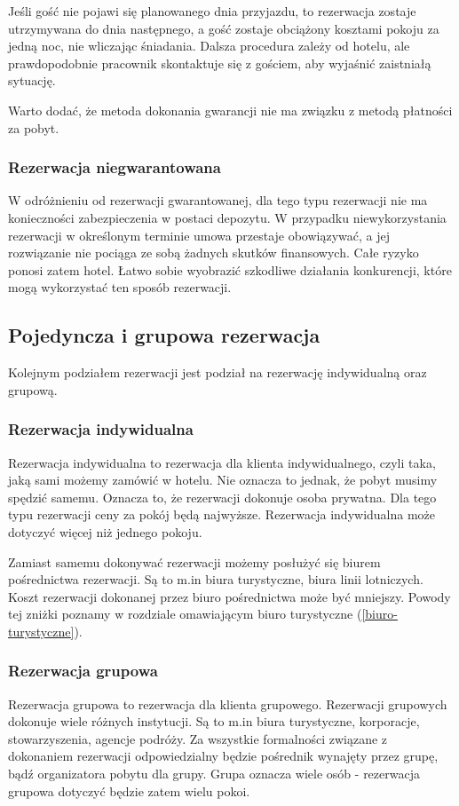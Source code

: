 \documentclass[a4paper,onecolumn,oneside,11pt,wide,floatssmall]{mwrep}
\theoremstyle{definition}
\theoremstyle{plain}%
\theoremstyle{remark}
\begin{document}
Jeśli gość nie pojawi się planowanego dnia przyjazdu, to rezerwacja zostaje 
utrzymywana do dnia następnego, a gość zostaje obciążony kosztami pokoju za 
jedną noc, nie wliczając śniadania. Dalsza procedura zależy od hotelu, ale 
prawdopodobnie pracownik skontaktuje się z gościem, aby wyjaśnić zaistniałą 
sytuację.

Warto dodać, że metoda dokonania gwarancji nie ma związku z metodą płatności 
za pobyt.

\subsubsection{Rezerwacja niegwarantowana}
W odróżnieniu od rezerwacji gwarantowanej, dla tego typu rezerwacji nie ma 
konieczności zabezpieczenia w postaci depozytu. W przypadku niewykorzystania rezerwacji w określonym terminie umowa przestaje obowiązywać, 
a jej rozwiązanie nie pociąga ze sobą żadnych skutków finansowych. Całe 
ryzyko ponosi zatem hotel. Łatwo sobie wyobrazić szkodliwe działania konkurencji, 
które mogą wykorzystać ten sposób rezerwacji.

\subsection{Pojedyncza i grupowa rezerwacja}
Kolejnym podziałem rezerwacji jest podział na rezerwację indywidualną oraz 
grupową. 

\subsubsection{Rezerwacja indywidualna}
Rezerwacja indywidualna to rezerwacja dla klienta indywidualnego, czyli taka, 
jaką sami możemy zamówić w hotelu. Nie oznacza to jednak, że pobyt musimy 
spędzić samemu. Oznacza to, że rezerwacji dokonuje osoba prywatna. Dla tego typu rezerwacji ceny za pokój będą najwyższe.
Rezerwacja indywidualna może dotyczyć więcej niż jednego pokoju.

Zamiast samemu dokonywać rezerwacji możemy posłużyć się biurem pośrednictwa 
rezerwacji. Są to m.in biura turystyczne, biura linii lotniczych. Koszt rezerwacji dokonanej przez biuro pośrednictwa może być mniejszy. Powody tej zniżki poznamy w rozdziale omawiającym biuro turystyczne (\ref{biuro-turystyczne}).

\subsubsection{Rezerwacja grupowa}
\label{rezerwacja-grupowa}
Rezerwacja grupowa to rezerwacja dla klienta grupowego. Rezerwacji grupowych 
dokonuje wiele różnych instytucji. Są to m.in biura turystyczne, korporacje, 
stowarzyszenia, agencje podróży. Za wszystkie formalności związane z 
dokonaniem rezerwacji odpowiedzialny będzie pośrednik wynajęty przez grupę, 
bądź organizatora pobytu dla grupy. Grupa oznacza wiele osób - rezerwacja 
grupowa dotyczyć będzie zatem wielu pokoi. 
\end{document}
